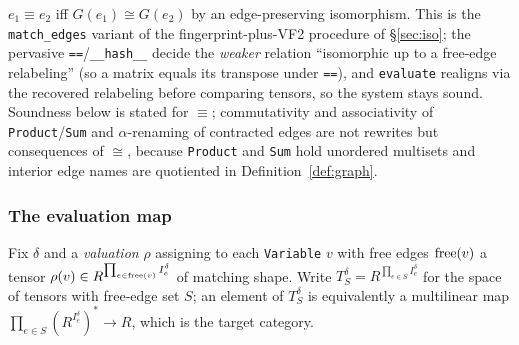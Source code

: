 \documentclass[sigplan,10pt,review]{acmart}
\begin{document}
\begin{definition}[Equality]
$e_1\equiv e_2$ iff $G(e_1)\cong G(e_2)$ by an edge-preserving
isomorphism. This is the \texttt{match\_edges} variant of the
fingerprint-plus-VF2 procedure of \S\ref{sec:iso}; the pervasive
\texttt{==}/\texttt{\_\_hash\_\_} decide the \emph{weaker} relation
``isomorphic up to a free-edge relabeling'' (so a matrix equals its
transpose under \texttt{==}), and \texttt{evaluate} realigns via the
recovered relabeling before comparing tensors, so the system stays
sound. Soundness below is stated for $\equiv$; commutativity and associativity of
\texttt{Product}/\texttt{Sum} and $\alpha$-renaming of contracted edges
are not rewrites but consequences of $\cong$, because \texttt{Product}
and \texttt{Sum} hold unordered multisets and interior edge names are
quotiented in Definition~\ref{def:graph}.
\end{definition}

\subsubsection*{The evaluation map}

Fix $\delta$ and a \emph{valuation} $\rho$ assigning to each
\texttt{Variable} $v$ with free edges $\operatorname{free}(v)$ a tensor
$\rho(v)\in R^{\prod_{e\in\operatorname{free}(v)} I_e^{\delta}}$ of matching shape.
Write $T^{\delta}_{S}=R^{\prod_{e\in S} I_e^{\delta}}$ for the space of
tensors with free-edge set $S$; an element of $T^{\delta}_S$ is
equivalently a multilinear map $\prod_{e\in S}(R^{I_e^\delta})^{*}\to R$,
which is the target category.
\end{document}
